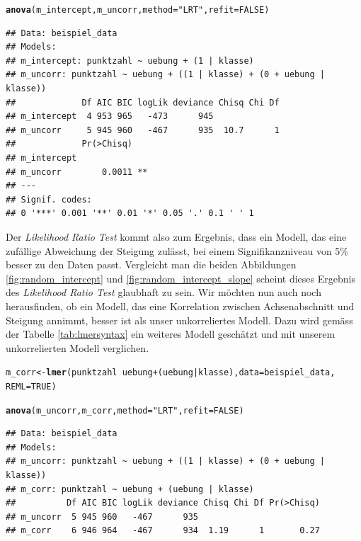 \documentclass[12pt, a4paper]{article}\usepackage[]{graphicx}\usepackage[]{color}
\makeatletter
\newcommand{\hlnum}[1]{\textcolor[rgb]{0.686,0.059,0.569}{#1}}%
\newcommand{\hlstr}[1]{\textcolor[rgb]{0.192,0.494,0.8}{#1}}%
\newcommand{\hlopt}[1]{\textcolor[rgb]{0,0,0}{#1}}%
\newcommand{\hlstd}[1]{\textcolor[rgb]{0.345,0.345,0.345}{#1}}%
\newcommand{\hlkwb}[1]{\textcolor[rgb]{0.69,0.353,0.396}{#1}}%
\newcommand{\hlkwc}[1]{\textcolor[rgb]{0.333,0.667,0.333}{#1}}%
\newcommand{\hlkwd}[1]{\textcolor[rgb]{0.737,0.353,0.396}{\textbf{#1}}}%
\newenvironment{kframe}{%
 \def\at@end@of@kframe{}%
 \ifinner\ifhmode%
  \def\at@end@of@kframe{\end{minipage}}%
  \begin{minipage}{\columnwidth}%
 \fi\fi%
 \def\FrameCommand##1{\hskip\@totalleftmargin \hskip-\fboxsep
 \colorbox{shadecolor}{##1}\hskip-\fboxsep
     \hskip-\linewidth \hskip-\@totalleftmargin \hskip\columnwidth}%
 \MakeFramed {\advance\hsize-\width
   \@totalleftmargin\z@ \linewidth\hsize
   \@setminipage}}%
 {\par\unskip\endMakeFramed%
 \at@end@of@kframe}
\newenvironment{knitrout}{}{} %
\makeatother
\begin{document}
\singlespacing
\begin{knitrout}
\color{fgcolor}\begin{kframe}
\begin{alltt}
\hlkwd{anova}\hlstd{(m_intercept, m_uncorr,} \hlkwc{method} \hlstd{=} \hlstr{"LRT"}\hlstd{,} \hlkwc{refit} \hlstd{=} \hlnum{FALSE}\hlstd{)}
\end{alltt}
\begin{verbatim}
## Data: beispiel_data
## Models:
## m_intercept: punktzahl ~ uebung + (1 | klasse)
## m_uncorr: punktzahl ~ uebung + ((1 | klasse) + (0 + uebung | klasse))
##             Df AIC BIC logLik deviance Chisq Chi Df
## m_intercept  4 953 965   -473      945             
## m_uncorr     5 945 960   -467      935  10.7      1
##             Pr(>Chisq)   
## m_intercept              
## m_uncorr        0.0011 **
## ---
## Signif. codes:  
## 0 '***' 0.001 '**' 0.01 '*' 0.05 '.' 0.1 ' ' 1
\end{verbatim}
\end{kframe}
\end{knitrout}

Der \textit{Likelihood Ratio Test} kommt also zum Ergebnis, dass ein Modell, das eine zufällige Abweichung der Steigung zulässt, bei einem Signifikanzniveau von 5\% besser zu den Daten passt. Vergleicht man die beiden Abbildungen \ref{fig:random_intercept} und \ref{fig:random_intercept_slope} scheint dieses Ergebnis des \textit{Likelihood Ratio Test} glaubhaft zu sein. Wir möchten nun auch noch herausfinden, ob ein Modell, das eine Korrelation zwischen Achsenabschnitt und Steigung annimmt, besser ist als unser unkorreliertes Modell. Dazu wird gemäss der Tabelle \ref{tab:lmersyntax} ein weiteres Modell geschätzt und mit unserem unkorrelierten Modell verglichen.

\singlespacing
\begin{knitrout}
\color{fgcolor}\begin{kframe}
\begin{alltt}
\hlstd{m_corr} \hlkwb{<-} \hlkwd{lmer}\hlstd{(punktzahl} \hlopt{~} \hlstd{uebung} \hlopt{+} \hlstd{(uebung} \hlopt{|} \hlstd{klasse),} \hlkwc{data} \hlstd{= beispiel_data,}
    \hlkwc{REML} \hlstd{=} \hlnum{TRUE}\hlstd{)}

\hlkwd{anova}\hlstd{(m_uncorr, m_corr,} \hlkwc{method} \hlstd{=} \hlstr{"LRT"}\hlstd{,} \hlkwc{refit} \hlstd{=} \hlnum{FALSE}\hlstd{)}
\end{alltt}
\begin{verbatim}
## Data: beispiel_data
## Models:
## m_uncorr: punktzahl ~ uebung + ((1 | klasse) + (0 + uebung | klasse))
## m_corr: punktzahl ~ uebung + (uebung | klasse)
##          Df AIC BIC logLik deviance Chisq Chi Df Pr(>Chisq)
## m_uncorr  5 945 960   -467      935                        
## m_corr    6 946 964   -467      934  1.19      1       0.27
\end{verbatim}
\end{kframe}
\end{knitrout}
\end{document}
